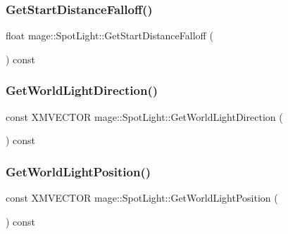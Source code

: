 \hypertarget{classmage_1_1_spot_light_a78ef6cc0ecd04cff8a4db9270e9ecb99}{}\label{classmage_1_1_spot_light_a78ef6cc0ecd04cff8a4db9270e9ecb99} 
\subsubsection{\texorpdfstring{Get\+Start\+Distance\+Falloff()}{GetStartDistanceFalloff()}}
{\footnotesize\ttfamily float mage\+::\+Spot\+Light\+::\+Get\+Start\+Distance\+Falloff (\begin{DoxyParamCaption}{ }\end{DoxyParamCaption}) const}

\hypertarget{classmage_1_1_spot_light_a6186ef354f57a58fbcd5ea1a7be2ec71}{}\label{classmage_1_1_spot_light_a6186ef354f57a58fbcd5ea1a7be2ec71} 
\subsubsection{\texorpdfstring{Get\+World\+Light\+Direction()}{GetWorldLightDirection()}}
{\footnotesize\ttfamily const X\+M\+V\+E\+C\+T\+OR mage\+::\+Spot\+Light\+::\+Get\+World\+Light\+Direction (\begin{DoxyParamCaption}{ }\end{DoxyParamCaption}) const}

\hypertarget{classmage_1_1_spot_light_af1dc0d77fed57540e52edb59716c5094}{}\label{classmage_1_1_spot_light_af1dc0d77fed57540e52edb59716c5094} 
\subsubsection{\texorpdfstring{Get\+World\+Light\+Position()}{GetWorldLightPosition()}}
{\footnotesize\ttfamily const X\+M\+V\+E\+C\+T\+OR mage\+::\+Spot\+Light\+::\+Get\+World\+Light\+Position (\begin{DoxyParamCaption}{ }\end{DoxyParamCaption}) const}

